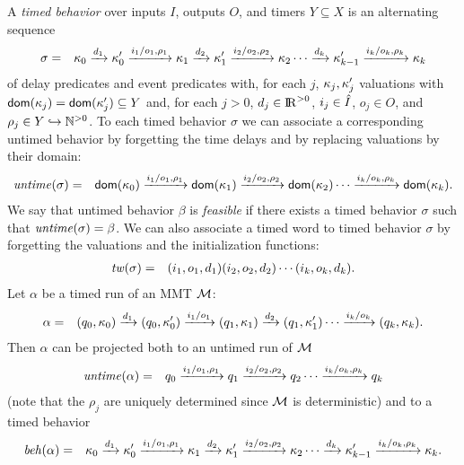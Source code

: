 A \emph{timed behavior} over inputs $I$, outputs $O$, and timers $Y \subseteq X$ is an alternating sequence
\begin{eqnarray*}
\sigma & = & \kappa_0 \xrightarrow{d_1} \kappa'_0 \xrightarrow{i_1/o_1, \rho_1} \kappa_1 \xrightarrow{d_2} \kappa'_1 \xrightarrow{i_2/o_2, \rho_2} \kappa_2 \cdots
\xrightarrow{d_k} \kappa'_{k-1} \xrightarrow{i_k/o_k, \rho_k} \kappa_{k}
\end{eqnarray*}
of delay predicates and event predicates with, for each $j$,
$\kappa_j, \kappa'_j$ valuations
with ${\textsf{dom}}(\kappa_j) = {\textsf{dom}}(\kappa'_j) \subseteq Y$ and,
for each $j>0$,  $d_j \in {\rm I\!R}^{> 0}$, $i_j \in \hat{I}$, $o_j \in O$, and $\rho_j \in Y \hookrightarrow {\mathbb N}^{>0}$.
To each timed behavior $\sigma$ we can associate a corresponding untimed behavior by forgetting the time
delays and by replacing valuations by their domain:
\begin{eqnarray*}
\mathit{untime}(\sigma) & = & {\textsf{dom}}(\kappa_0) \xrightarrow{i_1/o_1, \rho_1} {\textsf{dom}}(\kappa_1)  \xrightarrow{i_2/o_2, \rho_2} {\textsf{dom}}(\kappa_2) \cdots \xrightarrow{i_k/o_k, \rho_k} {\textsf{dom}}(\kappa_k).
\end{eqnarray*}
We say that untimed behavior $\beta$ is \emph{feasible} if there exists a timed behavior $\sigma$ such that $\mathit{untime}(\sigma) = \beta$.
We can also associate a timed word to timed behavior $\sigma$ by forgetting the valuations and the initialization functions:
\begin{eqnarray*}
\mathit{tw}(\sigma) & = & (i_1, o_1, d_1) (i_2, o_2, d_2) \cdots (i_k, o_k, d_k).
\end{eqnarray*} 
Let $\alpha$ be a timed run of an MMT ${\cal M}$: 
\begin{eqnarray*}
\alpha & = & (q_0, \kappa_0) \xrightarrow{d_1} (q_0, \kappa'_0) \xrightarrow{i_1/o_1} (q_1, \kappa_1) \xrightarrow{d_2} (q_1, \kappa'_1)  \cdots
 \xrightarrow{i_k/o_k} (q_k, \kappa_k).
\end{eqnarray*}
Then $\alpha$ can be projected both to an untimed run of ${\cal M}$
\begin{eqnarray*}
\mathit{untime} (\alpha) & = & q_0 \xrightarrow{i_1/o_1, \rho_1} q_1  \xrightarrow{i_2/o_2, \rho_2} q_2 \cdots \xrightarrow{i_k/o_k, \rho_k} q_k
\end{eqnarray*}
(note that the $\rho_j$ are uniquely determined since ${\cal M}$ is deterministic) and to a timed behavior
\begin{eqnarray*}
\mathit{beh}(\alpha) & = & \kappa_0 \xrightarrow{d_1} \kappa'_0 \xrightarrow{i_1/o_1, \rho_1} \kappa_1 \xrightarrow{d_2} \kappa'_1 \xrightarrow{i_2/o_2, \rho_2} \kappa_2 \cdots
\xrightarrow{d_k} \kappa'_{k-1} \xrightarrow{i_k/o_k, \rho_k} \kappa_{k}.
\end{eqnarray*}
